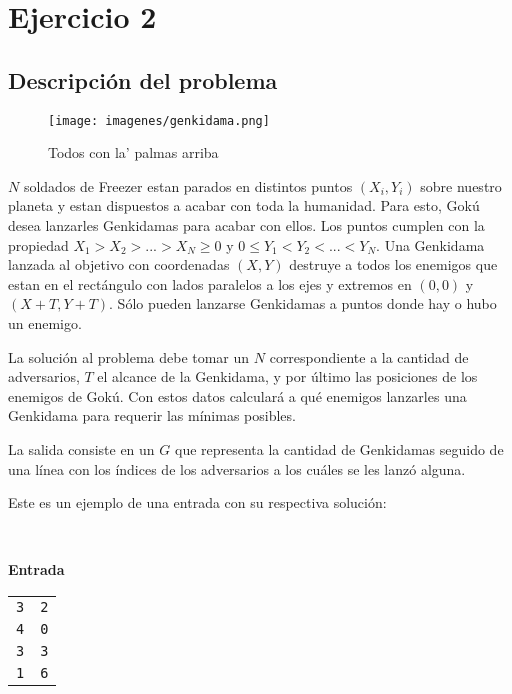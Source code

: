 
\section{Ejercicio 2}
	\subsection{Descripción del problema}

	\begin{figure}[ht]
		\begin{center}
			\texttt{[image: imagenes/genkidama.png]}
			\caption{Todos con la' palmas arriba}
		\end{center}
	\end{figure}

	$N$ soldados de Freezer estan parados en distintos puntos $(X_i,Y_i)$ sobre
	nuestro planeta y estan dispuestos a acabar con toda la humanidad. Para
	esto, Gokú desea lanzarles Genkidamas para acabar con ellos. Los puntos
	cumplen con la propiedad $ X_1 > X_2 >. . . > X_N \geq 0 $ y $ 0 \leq Y_1 <
	Y_2 < . . . < Y_N$. Una Genkidama lanzada al objetivo con coordenadas $(X,Y)$
	destruye a todos los enemigos que estan en el rectángulo con lados paralelos
	a los ejes y extremos en $(0, 0)$ y $(X + T, Y + T )$. Sólo pueden lanzarse
	Genkidamas a puntos donde hay o hubo un enemigo. 

	La solución al problema debe tomar un $N$ correspondiente a la cantidad de adversarios,
	$T$ el alcance de la Genkidama, y por último las posiciones de los enemigos
	de Gokú. Con estos datos calculará a qué enemigos lanzarles una
	Genkidama para requerir las mínimas posibles.

	La salida consiste en un $G$ que representa la cantidad de Genkidamas
	seguido de una línea con los índices de los adversarios a los cuáles se
	les lanzó alguna.

	Este es un ejemplo de una entrada con su respectiva
	solución:

	~

	\textbf{Entrada}

	\begin{tabular}{ll}
		\texttt{3} & \texttt{2} \\
		\texttt{4} & \texttt{0} \\
		\texttt{3} & \texttt{3} \\
		\texttt{1} & \texttt{6} \\
	\end{tabular}

